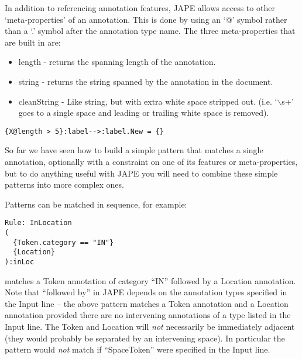 In addition to referencing annotation features, 
JAPE allows access to other `meta-properties' of an annotation.  This is done 
by using an `@' symbol rather than a `.' symbol after the annotation type name.
The three meta-properties that are built in are:
\begin{itemize}
\item length - returns the spanning length of the annotation.
\item string - returns the string spanned by the annotation in the document.
\item cleanString - Like string, but with extra white space stripped out.  
(i.e. `$\backslash$s+' goes to a single space and leading or trailing white 
space is removed).
\end{itemize}

\begin{small}
\begin{verbatim}
{X@length > 5}:label-->:label.New = {}
\end{verbatim}
\end{small}  


So far we have seen how to build a simple pattern that matches a single
annotation, optionally with a constraint on one of its features or
meta-properties, but to do anything useful with JAPE you will need to combine
these simple patterns into more complex ones.


Patterns can be matched in sequence, for example:
\begin{small}
\begin{verbatim}
Rule: InLocation
(
  {Token.category == "IN"}
  {Location}
):inLoc
\end{verbatim}
\end{small}
matches a Token annotation of category ``IN'' followed by a Location
annotation.  Note that ``followed by'' in JAPE depends on the annotation types
specified in the Input line -- the above pattern matches a Token annotation and
a Location annotation provided there are no intervening annotations of a type
listed in the Input line.  The Token and Location will {\em not} necessarily be
immediately adjacent (they would probably be separated by an intervening space).
In particular the pattern would {\em not} match if ``SpaceToken'' were
specified in the Input line.


